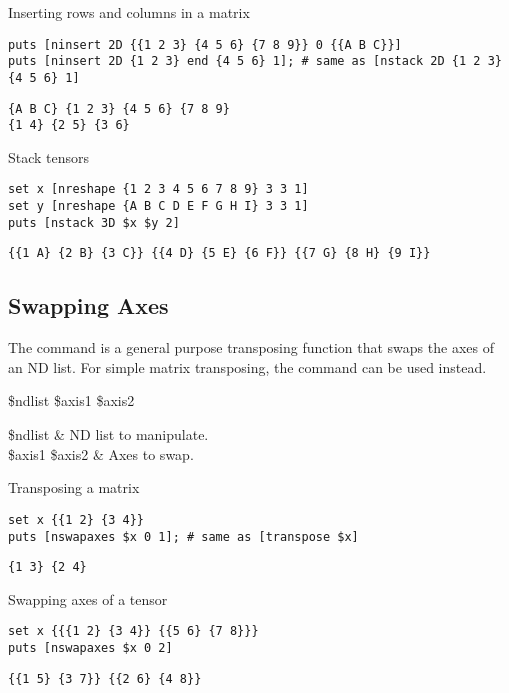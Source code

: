 \documentclass{article}
\begin{document}
\begin{example}{Inserting rows and columns in a matrix}
\begin{lstlisting}
puts [ninsert 2D {{1 2 3} {4 5 6} {7 8 9}} 0 {{A B C}}]
puts [ninsert 2D {1 2 3} end {4 5 6} 1]; # same as [nstack 2D {1 2 3} {4 5 6} 1]
\end{lstlisting}
\tcblower
\begin{lstlisting}
{A B C} {1 2 3} {4 5 6} {7 8 9}
{1 4} {2 5} {3 6}
\end{lstlisting}
\end{example}

\begin{example}{Stack tensors}
\begin{lstlisting}
set x [nreshape {1 2 3 4 5 6 7 8 9} 3 3 1]
set y [nreshape {A B C D E F G H I} 3 3 1]
puts [nstack 3D $x $y 2]
\end{lstlisting}
\tcblower
\begin{lstlisting}
{{1 A} {2 B} {3 C}} {{4 D} {5 E} {6 F}} {{7 G} {8 H} {9 I}}
\end{lstlisting}
\end{example}
\clearpage
\subsection{Swapping Axes}
The command  is a general purpose transposing function that swaps the axes of an ND list.
For simple matrix transposing, the command  can be used instead.
\begin{syntax}
 \$ndlist \$axis1 \$axis2
\end{syntax}
\begin{args}
\$ndlist & ND list to manipulate. \\
\$axis1 \$axis2 & Axes to swap.
\end{args}
\begin{example}{Transposing a matrix}
\begin{lstlisting}
set x {{1 2} {3 4}}
puts [nswapaxes $x 0 1]; # same as [transpose $x]
\end{lstlisting}
\tcblower
\begin{lstlisting}
{1 3} {2 4}
\end{lstlisting}
\end{example}
\begin{example}{Swapping axes of a tensor}
\begin{lstlisting}
set x {{{1 2} {3 4}} {{5 6} {7 8}}}
puts [nswapaxes $x 0 2]
\end{lstlisting}
\tcblower
\begin{lstlisting}
{{1 5} {3 7}} {{2 6} {4 8}}
\end{lstlisting}
\end{example}
\end{document}
